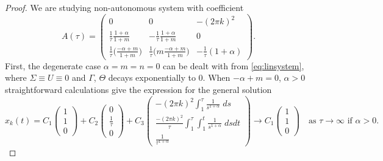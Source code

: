 \documentclass[a4paper,11pt]{article}
\def\k{(2\pi k)}
\theoremstyle{remark}
\begin{document}
\begin{proof}
We are studying non-autonomous system with coefficient
$$ A(\tau) =
   \begin{pmatrix}
   0 & 0 & -(2\pi k)^2\\
   \frac{1}{\tau}\frac{1+\alpha}{1+m} & -\frac{1}{\tau}\frac{1+\alpha}{1+m} & 0\\
   \frac{1}{\tau}\Big( \frac{-\alpha+m}{1+m}\Big) &
   \frac{1}{\tau}\Big(m\frac{-\alpha+m}{1+m}\Big) &
   -\frac{1}{\tau}(1+\alpha)
  \end{pmatrix}.$$
First, the degenerate case $\alpha=m=n=0$ can be dealt with from \eqref{eq:linsystem}, where $\Sigma\equiv U \equiv 0$ and $\Gamma$, $\Theta$ decays exponentially to $0$.
When $-\alpha+m=0$, $\alpha>0$ straightforward calculations give the expression for the general solution
$$x_k(t) = C_1 \begin{pmatrix} 1\\ 1\\0\end{pmatrix} + C_2 \begin{pmatrix} 0 \\ \frac{1}{\tau} \\0 \end{pmatrix} + C_3 \begin{pmatrix} -\k^2 \int_1^\tau \frac{1}{s^{1+\alpha}}\; ds \\ \frac{-\k^2}{\tau}\int_1^\tau  \int_1^t \frac{1}{s^{1+\alpha}}\; ds dt\\ \frac{1}{\tau^{1+\alpha}} \end{pmatrix}  \rightarrow C_1 \begin{pmatrix} 1\\ 1\\0\end{pmatrix}\quad \text{as $\tau \rightarrow \infty$ if $\alpha>0$.}$$


\end{proof}
\end{document}
